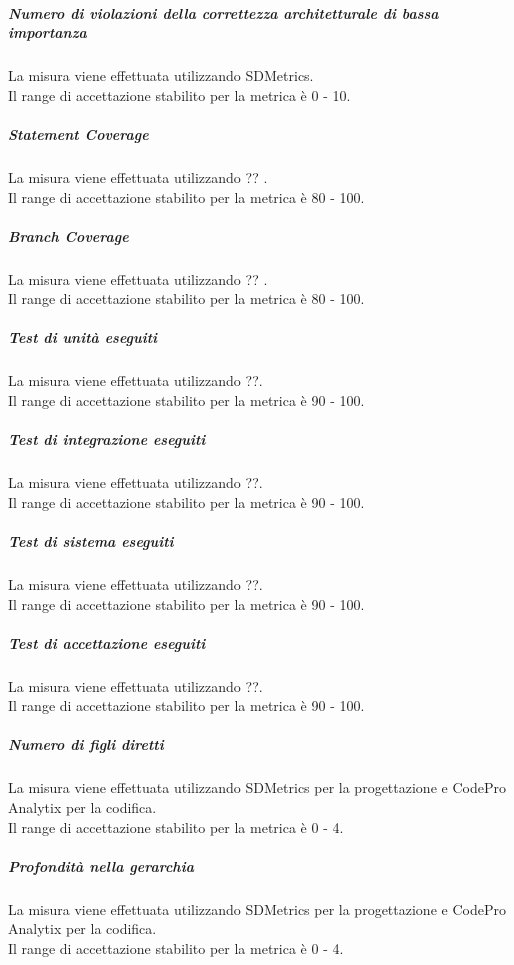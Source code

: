 			\subparagraph{Numero di violazioni della correttezza architetturale di bassa importanza}
			La misura viene effettuata utilizzando SDMetrics.
			\\Il range di accettazione stabilito per la metrica è 0 - 10.
			
			\subparagraph{Statement Coverage}
			La misura viene effettuata utilizzando ?? .
			\\Il range di accettazione stabilito per la metrica è 80 - 100.
			
			\subparagraph{Branch Coverage}
			La misura viene effettuata utilizzando ?? .
			\\Il range di accettazione stabilito per la metrica è 80 - 100.
			
			\subparagraph{Test di unità eseguiti}
			La misura viene effettuata utilizzando ??.
			\\Il range di accettazione stabilito per la metrica è 90 - 100.
			
			\subparagraph{Test di integrazione eseguiti}
			La misura viene effettuata utilizzando ??.
			\\Il range di accettazione stabilito per la metrica è 90 - 100.
			
			\subparagraph{Test di sistema eseguiti}
			La misura viene effettuata utilizzando ??.
			\\Il range di accettazione stabilito per la metrica è 90 - 100.
			
			\subparagraph{Test di accettazione eseguiti}
			La misura viene effettuata utilizzando ??.
			\\Il range di accettazione stabilito per la metrica è 90 - 100.
			
			\subparagraph{Numero di figli diretti}
			La misura viene effettuata utilizzando SDMetrics per la progettazione e CodePro Analytix per la codifica.
			\\Il range di accettazione stabilito per la metrica è 0 - 4.
			
			\subparagraph{Profondità nella gerarchia}
			La misura viene effettuata utilizzando SDMetrics per la progettazione e CodePro Analytix per la codifica.
			\\Il range di accettazione stabilito per la metrica è 0 - 4.

